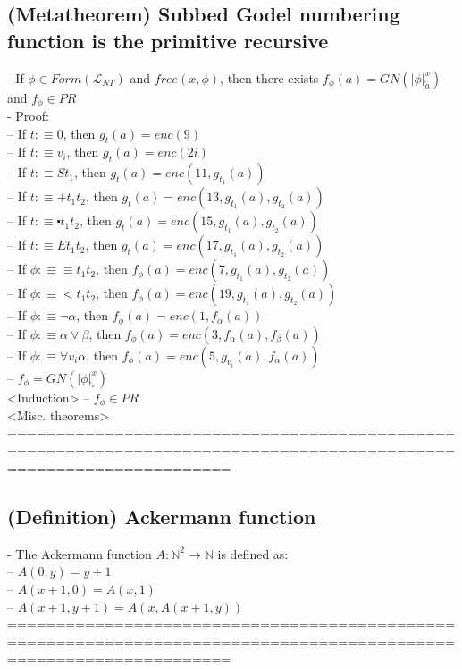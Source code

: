 \documentclass{book}
\newcommand{\is}{:\equiv}
\newcommand{\free}[2]{free(#1, #2)}
\newcommand{\placeholder}{\square}
\newcommand{\sub}[3]{\left|#1\right|_{#3}^{#2}}
\begin{document}
\subsection{(Metatheorem) Subbed Godel numbering function is the primitive recursive} %
	- If $\phi \in Form(\mathcal{L}_{NT})$ and $\free{x}{\phi}$, then there exists $f_\phi(a) = GN(\sub{\phi}{x}{\overleftarrow{a}})$ and $f_\phi \in PR$ \\
	- Proof: \\
		-- If $t \is 0$,                  then $g_t(a) = enc(9)$ \\
		-- If $t \is v_i$,                then $g_t(a) = enc(2i)$ \\
		-- If $t \is S t_1$,              then $g_t(a) = enc(11, g_{t_1}(a))$ \\
		-- If $t \is + t_1 t_2$,          then $g_t(a) = enc(13, g_{t_1}(a), g_{t_2}(a))$ \\
		-- If $t \is \centerdot t_1 t_2$, then $g_t(a) = enc(15, g_{t_1}(a), g_{t_2}(a))$ \\
		-- If $t \is E t_1 t_2$,          then $g_t(a) = enc(17, g_{t_1}(a), g_{t_2}(a))$ \\
		-- If $\phi \is \equiv t_1 t_2$,     then $f_\phi(a) = enc(7, g_{t_1}(a), g_{t_2}(a))$ \\
		-- If $\phi \is < t_1 t_2$,          then $f_\phi(a) = enc(19, g_{t_1}(a), g_{t_2}(a))$ \\
		-- If $\phi \is \lnot \alpha$,       then $f_\phi(a) = enc(1, f_\alpha(a))$ \\
		-- If $\phi \is \alpha \lor \beta$,  then $f_\phi(a) = enc(3, f_\alpha(a), f_\beta(a))$ \\
		-- If $\phi \is \forall v_i \alpha$, then $f_\phi(a) = enc(5, g_{v_i}(a), f_\alpha(a))$ \\
		-- $f_\phi = GN(\sub{\phi}{x}{\overleftarrow{\placeholder}})$ \\ <Induction>
		-- $f_\phi \in PR$ \\ <Misc. theorems>
	===================================================================================================================
\subsection{(Definition) Ackermann function} %
	- The Ackermann function $A: \mathbb{N}^2 \rightarrow \mathbb{N}$ is defined as: \\
		-- $A(0, y) = y+1$ \\
		-- $A(x+1, 0) = A(x, 1)$ \\
		-- $A(x+1, y+1) = A(x, A(x+1, y))$ \\
	===================================================================================================================
\end{document}
